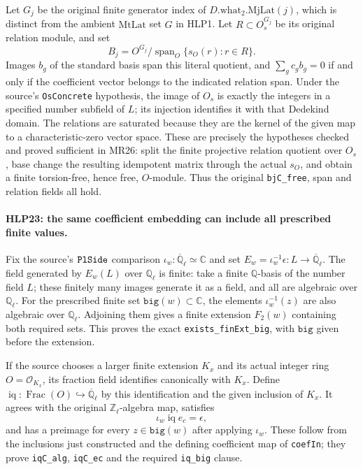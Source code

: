 Let \(G_j\) be the original finite generator index of
\(D.\mathrm{what}_2.\mathrm{MjLat}(j)\), which is distinct from the
ambient \(\mathrm{MtLat}\) set \(G\) in HLP1. Let
\(R\subset O_s^{G_j}\) be its original relation module, and set
\[
 B_j=O^{G_j}/\operatorname{span}_O\{s_O(r):r\in R\}.    \tag{HLP.21}
\]
Images \(b_g\) of the standard basis span this literal quotient,
and \(\sum_g c_gb_g=0\) if and only if the coefficient vector
belongs to the indicated relation span. Under the source's
\texttt{Os\allowbreak Concrete} hypothesis, the image of \(O_s\) is exactly
the integers in a specified number subfield of \(L\); its
injection identifies it with that Dedekind domain. The relations
are saturated because they are the kernel of the given map to a
characteristic-zero vector space. These are precisely the
hypotheses checked and proved sufficient in MR26: split the
finite projective relation quotient over \(O_s\), base change
the resulting idempotent matrix through the actual \(s_O\), and
obtain a finite torsion-free, hence free, \(O\)-module. Thus the
original \texttt{bj\allowbreak C\_\allowbreak free}, span and relation fields all hold.

\paragraph{HLP23: the same coefficient embedding can include all prescribed finite values.}
\label{claim:HLP23}
Fix the source's \(\texttt{Pl\allowbreak Side}\) comparison
\(\iota_w:\overline{\mathbb Q}_\ell\simeq\mathbb C\) and set
\(E_w=\iota_w^{-1}\epsilon:L\to\overline{\mathbb Q}_\ell\).
The field generated by \(E_w(L)\) over \(\mathbb Q_\ell\) is
finite: take a finite \(\mathbb Q\)-basis of the number field
\(L\); these finitely many images generate it as a field, and
all are algebraic over \(\mathbb Q_\ell\). For the prescribed
finite set \(\texttt{big}(w)\subset\mathbb C\), the elements
\(\iota_w^{-1}(z)\) are also algebraic over
\(\mathbb Q_\ell\). Adjoining them gives a finite extension
\(F_2(w)\) containing both required sets. This proves the exact
\texttt{exists\_\allowbreak fin\allowbreak Ext\_\allowbreak big}, with \(\texttt{big}\) given before
the extension.

If the source chooses a larger finite extension \(K_x\) and its
actual integer ring \(O=\mathcal O_{K_x}\), its fraction field
identifies canonically with \(K_x\). Define
\(\operatorname{iq}:\operatorname{Frac}(O)\hookrightarrow
\overline{\mathbb Q}_\ell\) by this identification and the given
inclusion of \(K_x\). It agrees with the original
\(\mathbb Z_\ell\)-algebra map, satisfies
\[
             \iota_w\operatorname{iq}e_c=\epsilon,   \tag{HLP.22}
\]
and has a preimage for every \(z\in\texttt{big}(w)\) after
applying \(\iota_w\). These follow from the inclusions just
constructed and the defining coefficient map of
\texttt{coef\allowbreak In}; they prove \texttt{iq\allowbreak C\_\allowbreak alg},
\texttt{iq\allowbreak C\_\allowbreak ec} and the required \texttt{iq\_\allowbreak big} clause.

